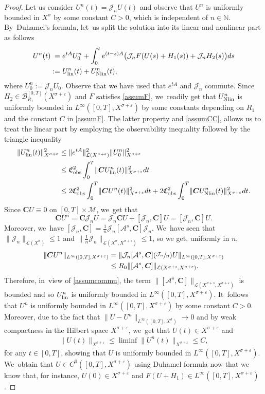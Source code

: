 \documentclass[JEP,XML,SOM,Unicode,published]{cedram}
\newcommand{\Psfrac}[2]{(\sfrac{#1}{#2})}
\newcommand{\lin}{\textup{lin}}
\newcommand{\Nlin}{\textup{Nlin}}
\theoremstyle{definition}
\let\mc\mathcal
\let\veps\varepsilon
\newcommand{\A}{\mc{A}}
\newcommand{\B}{\mc{B}}
\newcommand{\J}{\mc{J}}
\newcommand{\M}{\mc{M}}
\newcommand{\N}{\mathbb{N}}
\newcommand{\bC}{\boldsymbol{C}}
\providecommand{\norm}[1]{\lVert#1\rVert}
\begin{document}
\begin{proof}
Let us consider $U^n(t)=\J_nU(t)$ and observe that $U^n$ is uniformly bounded in $X^\sigma$ by some constant $C>0$, which is independent of $n\in \N$. By~Duhamel's formula, let~us split the solution into its linear and nonlinear part as follows
\begin{align*}
U^n(t)&\hphantom{:}=e^{tA}U_0^n+\int_0^t e^{(t-s)A}\big(\J_nF(U(s)+H_1(s))+\J_nH_2(s)\big)ds\\ &:=U_{\lin}^n(t)+U_{\Nlin}^n(t),
\end{align*}
where $U_0^n:=\J_n U_0$. Observe that we have used that $e^{tA}$ and $\J_n$ commute. Since \hbox{$H_2\in \B_{R_{1}}^{[0, T]}(X^{\sigma+\veps})$} and $F$ satisfies \cref{assumF}, we~readily get that $U_{\Nlin}^n$ is uniformly bounded in $L^\infty([0, T], X^{\sigma+\veps})$ by some constants depending on $R_{1}$ and the constant $C$ in \cref{assumF}. The latter property and \cref{assumCC}, allows us to treat the linear part by employing the observability inequality followed by the triangle inequality
\begin{align*}
\norm{U_{\lin}^n(t)}_{X^{\sigma+\veps}}^2&\leq \norm{e^{tA}}_{\mc{L}(X^{\sigma+\veps})}^2 \norm{U_0^n}_{X^{\sigma+\veps}}^2\\
&\leq \mathfrak{C}_{\textup{obs}}^2\int_0^T \norm{\bC U_{\lin}^n(t)}_{X^{\sigma+\veps}}^2dt\\
&\leq 2\mathfrak{C}_{\textup{obs}}^2\int_0^T \norm{\bC U^n(t)}_{X^{\sigma+\veps}}^2dt+2\mathfrak{C}_{\textup{obs}}^2\int_0^T \norm{\bC U_{\Nlin}^n(t)}_{X^{\sigma+\veps}}^2dt.
\end{align*}
Since $\bC U\equiv 0$ on $[0, T]\times \M$, we~get that
\[
\bC U^n=\bC\mc{J}_n U=\mc{J}_n\bC U+[\mc{J}_n,\bC]U=[\mc{J}_n,\bC]U.
\]
Moreover, we~have $[\mc{J}_n,\bC]=\frac{1}{n}\mc{J}_n[\A^s,\bC]\mc{J}_n$. We~have seen that $\norm{\mc{J}_n}_{\mc{L}(X^\sigma)}\leq 1$ and $\norm{\frac{1}{n}\mc{J}_n}_{\mc{L}(X^{\sigma}, X^{\sigma+s})}\leq 1$, so we get, uniformly in $n$,
\begin{align*}
\norm{\bC U^n}_{L^\infty([0, T], X^{\sigma+\veps})}&=\norm{\mc{J}_n[\A^s,\bC]\Psfrac{\mc{J}_n}{n} U}_{L^\infty([0, T], X^{\sigma+\veps})}\\
&\leq R_0\norm{[\A^s,\bC]}_{\mc{L}(X^{\sigma+s}, X^{\sigma+\veps})}.
\end{align*}
Therefore, in~view of \cref{assumcommu}, the term $\norm{[\A^s,\bC]}_{\mc{L}(X^{\sigma+s}, X^{\sigma+\veps})}$ is bounded and so $U_{\lin}^n$ is uniformly bounded in $L^\infty([0, T], X^{\sigma+\veps})$. It~follows that $U^n$ is uniformly bounded in $L^\infty([0, T], X^{\sigma+\veps})$ by some constant $C>0$. Moreover, due to the fact that $\norm{U-U^n}_{L^\infty([0, T], X^\sigma)}\to 0$ and by weak compactness in the Hilbert space $X^{\sigma+\veps}$, we~get that $U(t)\in X^{\sigma+\veps}$ and
\begin{align*}
\norm{U(t)}_{X^{\sigma+\veps}}\leq \liminf \norm{U^n(t)}_{X^{\sigma+\veps}}\leq C,
\end{align*}
for any $t\in [0, T]$, showing that $U$ is uniformly bounded in $L^\infty([0, T], X^{\sigma+\veps})$. We~obtain that $U\in C^0([0, T], X^{\sigma+\veps})$ using Duhamel formula now that we know that, for instance, $U(0)\in X^{\sigma+\veps}$ and $F(U+H_1)\in L^\infty([0, T], X^{\sigma+\veps})$.
\end{proof}
\end{document}
